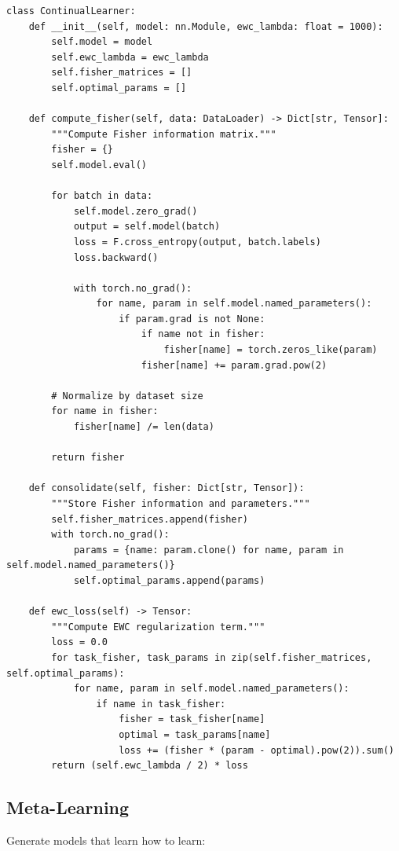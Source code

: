 \begin{verbatim}
class ContinualLearner:
    def __init__(self, model: nn.Module, ewc_lambda: float = 1000):
        self.model = model
        self.ewc_lambda = ewc_lambda
        self.fisher_matrices = []
        self.optimal_params = []

    def compute_fisher(self, data: DataLoader) -> Dict[str, Tensor]:
        """Compute Fisher information matrix."""
        fisher = {}
        self.model.eval()

        for batch in data:
            self.model.zero_grad()
            output = self.model(batch)
            loss = F.cross_entropy(output, batch.labels)
            loss.backward()

            with torch.no_grad():
                for name, param in self.model.named_parameters():
                    if param.grad is not None:
                        if name not in fisher:
                            fisher[name] = torch.zeros_like(param)
                        fisher[name] += param.grad.pow(2)

        # Normalize by dataset size
        for name in fisher:
            fisher[name] /= len(data)

        return fisher

    def consolidate(self, fisher: Dict[str, Tensor]):
        """Store Fisher information and parameters."""
        self.fisher_matrices.append(fisher)
        with torch.no_grad():
            params = {name: param.clone() for name, param in self.model.named_parameters()}
            self.optimal_params.append(params)

    def ewc_loss(self) -> Tensor:
        """Compute EWC regularization term."""
        loss = 0.0
        for task_fisher, task_params in zip(self.fisher_matrices, self.optimal_params):
            for name, param in self.model.named_parameters():
                if name in task_fisher:
                    fisher = task_fisher[name]
                    optimal = task_params[name]
                    loss += (fisher * (param - optimal).pow(2)).sum()
        return (self.ewc_lambda / 2) * loss
\end{verbatim}

\subsection{Meta-Learning}

Generate models that learn how to learn:

